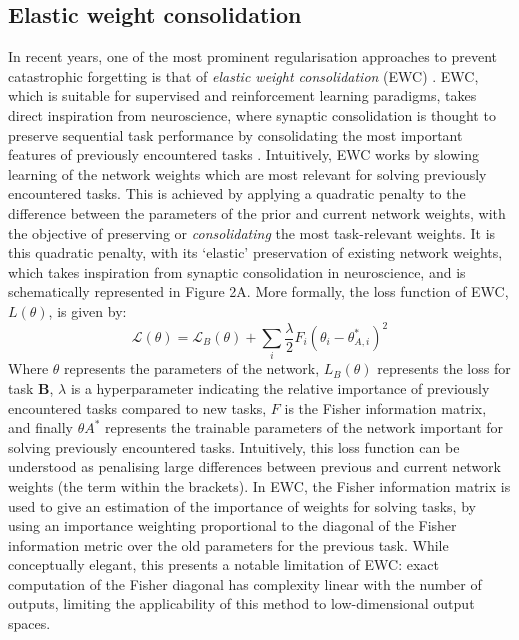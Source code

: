 \documentclass{article} %
\begin{document}
\subsection*{Elastic weight consolidation}

In recent years, one of the most prominent regularisation approaches to prevent catastrophic forgetting is that of \textit{elastic weight consolidation} (EWC) \citep{kirkpatrick2017overcoming}. EWC, which is suitable for supervised and reinforcement learning paradigms, takes direct inspiration from neuroscience, where synaptic consolidation is thought to preserve sequential task performance by consolidating the most important features of previously encountered tasks \citep{yang2009stably}. Intuitively, EWC works by slowing learning of the network weights which are most relevant for solving previously encountered tasks. This is achieved by applying a quadratic penalty to the difference between the parameters of the prior and current network weights, with the objective of preserving or \textit{consolidating} the most task-relevant weights. It is this quadratic penalty, with its ‘elastic’ preservation of existing network weights, which takes inspiration from synaptic consolidation in neuroscience, and is schematically represented in Figure 2A. More formally, the loss function of EWC, $L(\theta)$, is given by:
$$
\mathcal{L}(\theta)=\mathcal{L}_{B}(\theta)+\sum_{i} \frac{\lambda}{2} F_{i}\left(\theta_{i}-\theta_{A, i}^{*}\right)^{2}
$$
Where $\theta$ represents the parameters of the network, $L_B(\theta)$ represents the loss for task \textbf{B}, $\lambda$ is a hyperparameter indicating the relative importance of previously encountered tasks compared to new tasks, $F$ is the Fisher information matrix, and finally $\theta A^*$ represents the trainable parameters of the network important for solving previously encountered tasks. Intuitively, this loss function can be understood as penalising large differences between previous and current network weights (the term within the brackets). In EWC, the Fisher information matrix is used to give an estimation of the importance of weights for solving tasks, by using an importance weighting proportional to the diagonal of the Fisher information metric over the old parameters for the previous task. While conceptually elegant, this presents a notable limitation of EWC: exact computation of the Fisher diagonal has complexity linear with the number of outputs, limiting the applicability of this method to low-dimensional output spaces.
\end{document}
